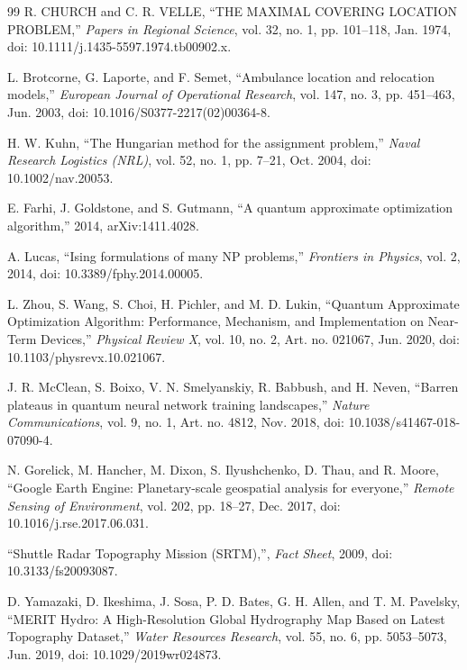 \documentclass[10pt,twocolumn]{article}
\begin{document}
{\begin{thebibliography}{99}
R. CHURCH and C. R. VELLE, ``THE MAXIMAL COVERING LOCATION PROBLEM,'' \emph{Papers in Regional Science}, vol. 32, no. 1, pp. 101--118, Jan. 1974, doi: 10.1111/j.1435-5597.1974.tb00902.x.

L. Brotcorne, G. Laporte, and F. Semet, ``Ambulance location and relocation models,'' \emph{European Journal of Operational Research}, vol. 147, no. 3, pp. 451--463, Jun. 2003, doi: 10.1016/S0377-2217(02)00364-8.

H. W. Kuhn, ``The Hungarian method for the assignment problem,'' \emph{Naval Research Logistics (NRL)}, vol. 52, no. 1, pp. 7--21, Oct. 2004, doi: 10.1002/nav.20053.

E. Farhi, J. Goldstone, and S. Gutmann, ``A quantum approximate optimization algorithm,'' 2014, arXiv:1411.4028.

A. Lucas, ``Ising formulations of many NP problems,'' \emph{Frontiers in Physics}, vol. 2, 2014, doi: 10.3389/fphy.2014.00005.

L. Zhou, S. Wang, S. Choi, H. Pichler, and M. D. Lukin, ``Quantum Approximate Optimization Algorithm: Performance, Mechanism, and Implementation on Near-Term Devices,'' \emph{Physical Review X}, vol. 10, no. 2, Art. no. 021067, Jun. 2020, doi: 10.1103/physrevx.10.021067.

J. R. McClean, S. Boixo, V. N. Smelyanskiy, R. Babbush, and H. Neven, ``Barren plateaus in quantum neural network training landscapes,'' \emph{Nature Communications}, vol. 9, no. 1, Art. no. 4812, Nov. 2018, doi: 10.1038/s41467-018-07090-4.

N. Gorelick, M. Hancher, M. Dixon, S. Ilyushchenko, D. Thau, and R. Moore, ``Google Earth Engine: Planetary-scale geospatial analysis for everyone,'' \emph{Remote Sensing of Environment}, vol. 202, pp. 18--27, Dec. 2017, doi: 10.1016/j.rse.2017.06.031.

``Shuttle Radar Topography Mission (SRTM),'', \emph{Fact Sheet}, 2009, doi: 10.3133/fs20093087.

D. Yamazaki, D. Ikeshima, J. Sosa, P. D. Bates, G. H. Allen, and T. M. Pavelsky, ``MERIT Hydro: A High-Resolution Global Hydrography Map Based on Latest Topography Dataset,'' \emph{Water Resources Research}, vol. 55, no. 6, pp. 5053--5073, Jun. 2019, doi: 10.1029/2019wr024873.


\end{thebibliography}}
\end{document}
